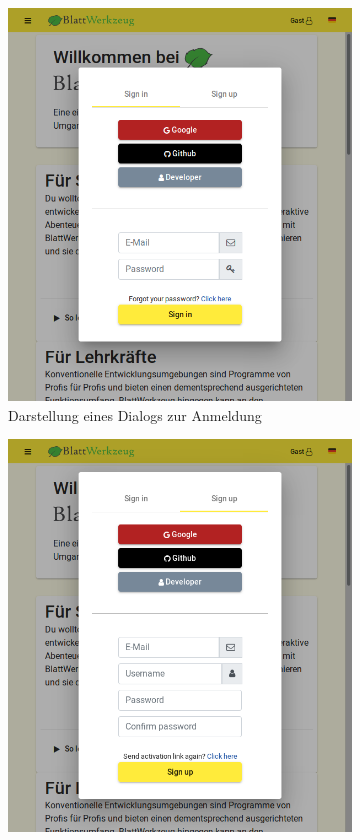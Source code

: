 \begin{figure}[h]
	\centering
	\begin{subfigure}{.5\textwidth}
		\includegraphics[width=.95\linewidth]{graphics/dialog-sign-in.png}
		\caption{Darstellung eines Dialogs zur Anmeldung}
		\label{fig:dialog_sign_in}
	\end{subfigure}%
	\begin{subfigure}{.5\textwidth}
		\includegraphics[width=.95\linewidth]{graphics/dialog-sign-up.png}

\end{subfigure}
\end{figure}
